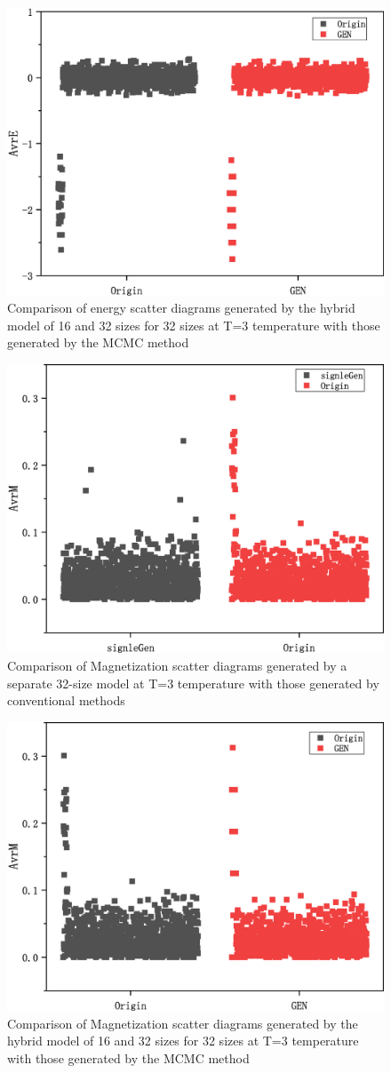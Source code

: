 \documentclass[%
reprint,
amsmath,amssymb,
aps,
]{revtex4-2}
\begin{document}
	\begin{figure}
		\centering
		\includegraphics[width=0.7\linewidth]{16mix32_32_T_3_E_sactter}
		\caption{Comparison of energy scatter diagrams generated by the hybrid model of 16 and 32 sizes for 32 sizes at T=3 temperature with those generated by the MCMC method}
		\label{fig:16mix3232t3esactter}
	\end{figure}
	\begin{figure}
		\centering
		\includegraphics[width=0.7\linewidth]{32_T_3_M_scatter}
		\caption{Comparison of Magnetization scatter diagrams generated by a separate 32-size model at T=3 temperature with those generated by conventional methods}
		\label{fig:32t3mscatter}
	\end{figure}
	\begin{figure}
		\centering
		\includegraphics[width=0.7\linewidth]{16mix32_32_T_3_M_scatter}
		\caption{Comparison of Magnetization scatter diagrams generated by the hybrid model of 16 and 32 sizes for 32 sizes at T=3 temperature with those generated by the MCMC method}
		\label{fig:16mix3232t3mscatter}
	\end{figure}
	
\end{document}
